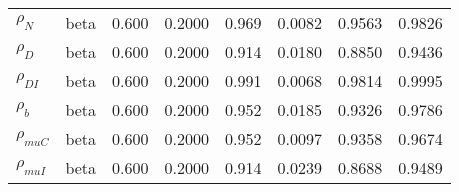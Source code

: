 \begin{center}
\begin{longtable}{llcccccc}
${\rho_N}$ & beta &   0.600 & 0.2000 &   0.969& 0.0082 &  0.9563 &  0.9826 \\ 
${\rho_D}$ & beta &   0.600 & 0.2000 &   0.914& 0.0180 &  0.8850 &  0.9436 \\ 
${\rho_{DI}}$ & beta &   0.600 & 0.2000 &   0.991& 0.0068 &  0.9814 &  0.9995 \\ 
${\rho_b}$ & beta &   0.600 & 0.2000 &   0.952& 0.0185 &  0.9326 &  0.9786 \\ 
${\rho_{muC}}$ & beta &   0.600 & 0.2000 &   0.952& 0.0097 &  0.9358 &  0.9674 \\ 
${\rho_{muI}}$ & beta &   0.600 & 0.2000 &   0.914& 0.0239 &  0.8688 &  0.9489 \\ 
\end{longtable}
 \end{center}
